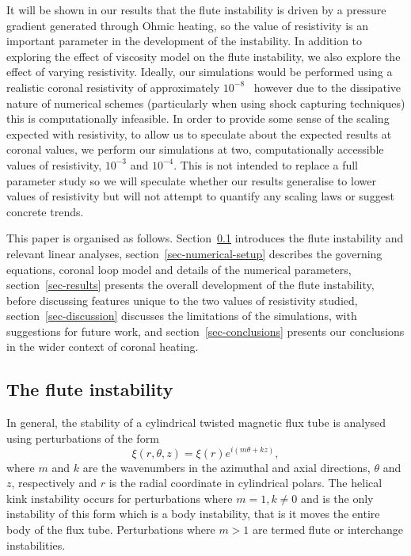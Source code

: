 \documentclass[fleqn,usenatbib]{mnras}
\newcommand{\rev}[1]{{\color{red} #1}}
\begin{document}
\rev{It will be shown in our results that the flute instability is driven by
a pressure gradient generated through Ohmic heating, so the value of
resistivity is an important parameter in the development of the instability. In
addition to exploring the effect of viscosity model on the flute instability,
we also explore the effect of varying resistivity. Ideally, our simulations
would be performed using a realistic coronal resistivity of approximately
$10^{-8}$~\citep{craigAnisotropicViscousDissipation2009a} however due to the
dissipative nature of numerical schemes (particularly when using shock
capturing techniques) this is computationally infeasible. In order to provide
some sense of the scaling expected with resistivity, to allow us to speculate
about the expected results at coronal values, we perform our simulations at
two, computationally accessible values of resistivity, $10^{-3}$ and $10^{-4}$.
This is not intended to replace a full parameter study so we will speculate
whether our results generalise to lower values of resistivity but will not
attempt to quantify any scaling laws or suggest concrete trends.}

This paper is organised as follows. Section~\ref{sec-flute-intro} introduces
the flute instability and relevant linear analyses,
section~\ref{sec-numerical-setup} describes the governing equations, coronal
loop model and details of the numerical parameters, section~\ref{sec-results}
presents the overall development of the flute instability, before discussing
features unique to the two values of resistivity studied,
section~\ref{sec-discussion} discusses the limitations of the simulations, with
suggestions for future work, and section~\ref{sec-conclusions} presents our
conclusions in the wider context of coronal heating.

\subsection{The flute instability}
\label{sec-flute-intro}

In general, the stability of a cylindrical twisted magnetic flux tube is analysed using perturbations of the form
\begin{equation}
  \label{eq:kink_perturbation}
\xi(r, \theta, z) = \xi(r) e^{i(m\theta + kz)},
\end{equation}
where $m$ and $k$ are the wavenumbers in the azimuthal and axial directions,
$\theta$ and $z$, respectively and $r$ is the radial coordinate in cylindrical
polars. The helical kink instability occurs for perturbations where $m=1,
k\ne0$ and is the only instability of this form which is a body instability,
that is it moves the entire body of the flux tube. Perturbations where $m>1$
are termed flute or interchange instabilities.
\end{document}
